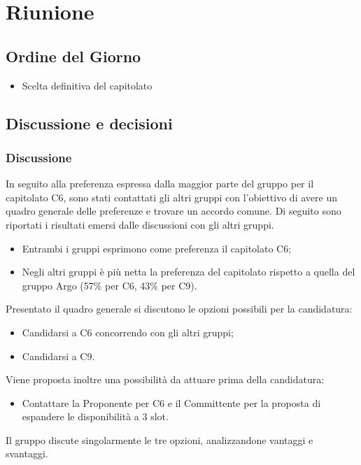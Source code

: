 \section{Riunione}
\subsection{Ordine del Giorno}
\begin{itemize}
	\item Scelta definitiva del capitolato
\end{itemize}

\subsection{Discussione e decisioni}
\subsubsection{Discussione}
In seguito alla preferenza espressa dalla maggior parte del gruppo per il capitolato C6, sono stati contattati gli altri gruppi con l’obiettivo di avere un quadro generale delle preferenze e trovare un accordo comune. Di seguito sono riportati i risultati emersi dalle discussioni con gli altri gruppi.
\begin{itemize}
	\item Entrambi i gruppi esprimono come preferenza il capitolato C6;
	\item Negli altri gruppi è più netta la preferenza del capitolato rispetto a quella del gruppo Argo (57\% per C6, 43\% per C9).
\end{itemize}
Presentato il quadro generale si discutono le opzioni possibili per la candidatura:
\begin{itemize}
	\item Candidarsi a C6 concorrendo con gli altri gruppi;
	\item Candidarsi a C9.
\end{itemize}
Viene proposta inoltre una possibilità da attuare prima della candidatura:
\begin{itemize}
	\item Contattare la Proponente per C6 e il Committente per la proposta di espandere le disponibilità a 3 slot.
\end{itemize}
Il gruppo discute singolarmente le tre opzioni, analizzandone vantaggi e svantaggi.
